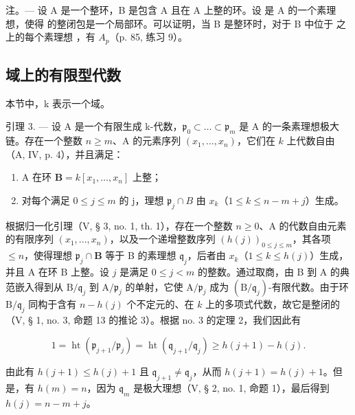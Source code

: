 注。--- 设 A 是一个整环，B 是包含 A 且在 A 上整的环。设  是 A 的一个素理想，使得  的整闭包是一个局部环。可以证明，当 B 是整环时，对于 B 中位于  之上的每个素理想  ，有 \(A_{p}\)（p. 85, 练习 9）。

\subsection{域上的有限型代数}

本节中，k 表示一个域。

引理 3. --- 设 A 是一个有限生成 k-代数，\(\mathfrak{p}_{0} \subset \ldots \subset \mathfrak{p}_{m}\) 是 A 的一条素理想极大链。存在一个整数 \(n \geqslant m\)、A 的元素序列 \((x_{1}, \ldots, x_{n})\)，它们在 \(k\) 上代数自由（A, IV, p. 4），并且满足：

\begin{enumerate}
\def\labelenumi{\alph{enumi})}
\item
  A 在环 \(\mathbf{B} = k[x_1, \ldots, x_n]\) 上整；
\item
  对每个满足 \(0 \leqslant j \leqslant m\) 的 j，理想 \(\mathfrak{p}_{j} \cap B\) 由 \(x_{k}\)（\(1 \leqslant k \leqslant n - m + j\)）生成。
\end{enumerate}

根据归一化引理（V, § 3, no. 1, th. 1），存在一个整数 \(n \geqslant 0\)、A 的代数自由元素的有限序列 \((x_1, ..., x_n)\)，以及一个递增整数序列 \((h(j))_{0 \leqslant j \leqslant m}\)，其各项 \(\leqslant n\)，使得理想 \(\mathfrak{p}_j \cap \mathbf{B}\) 等于 B 的素理想 \(\mathfrak{q}_j\)，后者由 \(x_k\)（\(1 \leqslant k \leqslant h(j)\)）生成，并且 A 在环 B 上整。设 \(j\) 是满足 \(0 \leqslant j < m\) 的整数。通过取商，由 B 到 A 的典范嵌入得到从 \(\mathrm{B} / \mathfrak{q}_j\) 到 \(\mathrm{A} / \mathfrak{p}_j\) 的单射，它使 \(\mathrm{A} / \mathfrak{p}_j\) 成为 \((\mathrm{B} / \mathfrak{q}_j)\)-有限代数。由于环 \(\mathrm{B} / \mathfrak{q}_j\) 同构于含有 \(n - h(j)\) 个不定元的、在 \(k\) 上的多项式代数，故它是整闭的（V, § 1, no. 3, 命题 13 的推论 3）。根据 no. 3 的定理 2，我们因此有

\[
1 = \operatorname{ht} \left(\mathfrak {p} _ {j + 1} / \mathfrak {p} _ {j}\right) = \operatorname{ht} \left(\mathfrak {q} _ {j + 1} / \mathfrak {q} _ {j}\right) \geqslant h (j + 1) - h (j).
\]

由此有 \(h(j + 1) \leqslant h(j) + 1\) 且 \(\mathfrak{q}_{j+1} \neq \mathfrak{q}_j\)，从而 \(h(j + 1) = h(j) + 1\)。但是，有 \(h(m) = n\)，因为 \(\mathfrak{q}_m\) 是极大理想（V, § 2, no. 1, 命题 1），最后得到 \(h(j) = n - m + j\)。

